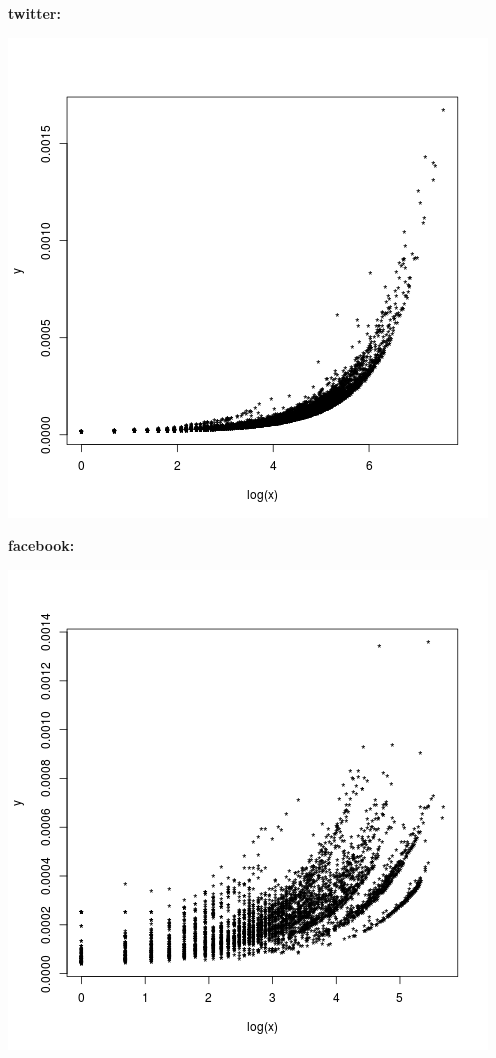 \documentclass[palatino,nochap]{apuntes}
\begin{document}
\textbf{twitter:}

\begin{center}
	\includegraphics[scale=0.45]{img/twitter_grado-pr}
\end{center}


\textbf{facebook:}

\begin{center}
	\includegraphics[scale=0.45]{img/fb_grado-pr}
\end{center}
\end{document}
